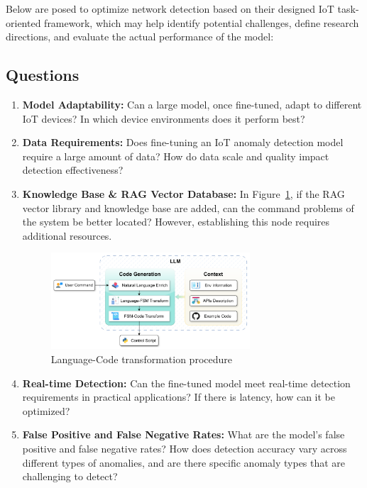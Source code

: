 \documentclass[12pt]{article}
\begin{document}
  Below are posed to optimize network detection based on their designed IoT task-oriented framework,
  which may help identify potential challenges, define research directions,
  and evaluate the actual performance of the model:

\subsection{Questions}
\begin{enumerate}[label=\arabic*.]
  
  \item \textbf{Model Adaptability:} Can a large model, once fine-tuned, adapt to different IoT devices? In which device environments does it perform best?
  
  \item \textbf{Data Requirements:} Does fine-tuning an IoT anomaly detection model require a large amount of data? How do data scale and quality impact detection effectiveness?
  
  \item \textbf{Knowledge Base \& RAG Vector Database:} In Figure~\ref{fig:fsmProcedure}, if the RAG vector library and knowledge base are added, can the command problems of the system be better located? However, establishing this node requires additional resources.

  \begin{figure}[h] %
    \centering
    \includegraphics[width=0.7\textwidth]{./img/language_code_trans_procedure.png} %
    \caption{Language-Code transformation procedure}
    \label{fig:fsmProcedure}
  \end{figure}

  \item \textbf{Real-time Detection:} Can the fine-tuned model meet real-time detection requirements in practical applications? If there is latency, how can it be optimized?
  
  \item \textbf{False Positive and False Negative Rates:} What are the model's false positive and false negative rates? How does detection accuracy vary across different types of anomalies, and are there specific anomaly types that are challenging to detect?
  

\end{enumerate}
\end{document}
